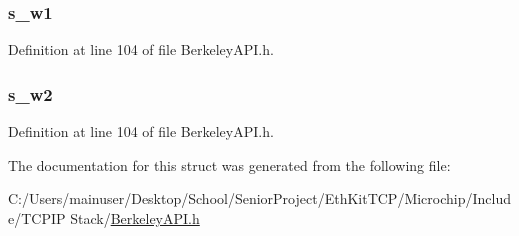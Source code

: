 \subsubsection[{s\+\_\+w1}]{ s\+\_\+w1}\label{structin__addr_a98e4022e8f9139a753a5a4756a356080}


Definition at line 104 of file Berkeley\+A\+P\+I.\+h.

\hypertarget{structin__addr_ae4fe55fa27939aa701135e5e0cf7fd31}{}
\subsubsection[{s\+\_\+w2}]{ s\+\_\+w2}\label{structin__addr_ae4fe55fa27939aa701135e5e0cf7fd31}


Definition at line 104 of file Berkeley\+A\+P\+I.\+h.



The documentation for this struct was generated from the following file\+:\begin{DoxyCompactItemize}
\item 
C\+:/\+Users/mainuser/\+Desktop/\+School/\+Senior\+Project/\+Eth\+Kit\+T\+C\+P/\+Microchip/\+Include/\+T\+C\+P\+I\+P Stack/\hyperlink{_berkeley_a_p_i_8h}{Berkeley\+A\+P\+I.\+h}\end{DoxyCompactItemize}
